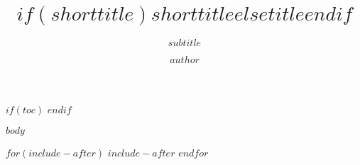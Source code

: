 \documentclass[$if(draft)$draft$endif$]{$documentclass$}
\title{$if(shorttitle)$$shorttitle$$else$$title$$endif$}{$title$}
\subtitle{$subtitle$}
\author{$author$}
\begin{document}
\maketitle

$if(toc)$
\tableofcontents
$endif$

$body$

$for(include-after)$
$include-after$
$endfor$
\label{LastPage}
\end{document}
